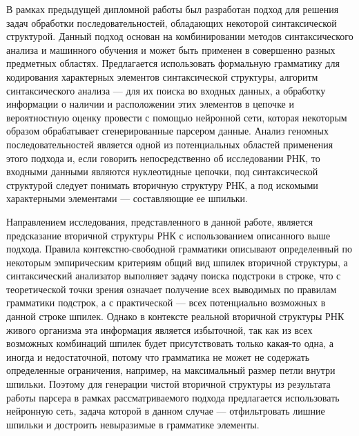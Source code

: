 В рамках предыдущей дипломной работы был разработан подход для решения задач обработки последовательностей, обладающих некоторой синтаксической структурой. Данный подход основан на комбинировании методов синтаксического анализа и машинного обучения и может быть применен в совершенно разных предметных областях. Предлагается использовать формальную грамматику для кодирования характерных элементов синтаксической структуры, алгоритм синтаксического анализа --- для их поиска во входных данных, а обработку информации о наличии и расположении этих элементов в цепочке и вероятностную оценку провести с помощью нейронной сети, которая некоторым образом обрабатывает сгенерированные парсером данные. Анализ геномных последовательностей является одной из потенциальных областей применения этого подхода и, если говорить непосредственно об исследовании РНК, то входными данными являются нуклеотидные цепочки, под синтаксической структурой следует понимать вторичную структуру РНК, а под искомыми характерными элементами --- составляющие ее шпильки. 

Направлением исследования, представленного в данной работе, является предсказание вторичной структуры РНК с использованием описанного выше подхода. Правила контекстно-свободной грамматики описывают определенный по некоторым эмпирическим критериям общий вид шпилек вторичной структуры, а синтаксический анализатор выполняет задачу поиска подстроки в строке, что с теоретической точки зрения означает получение всех выводимых по правилам грамматики подстрок, а с практической --- всех потенциально возможных в данной строке шпилек. Однако в контексте реальной вторичной структуры РНК живого организма эта информация является избыточной, так как из всех возможных комбинаций шпилек будет присутствовать только какая-то одна, а иногда и недостаточной, потому что грамматика не может не содержать определенные ограничения, например, на максимальный размер петли внутри шпильки. Поэтому для генерации чистой вторичной структуры из результата работы парсера в рамках рассматриваемого подхода предлагается использовать нейронную сеть, задача которой в данном случае --- отфильтровать лишние шпильки и достроить невыразимые в грамматике элементы.